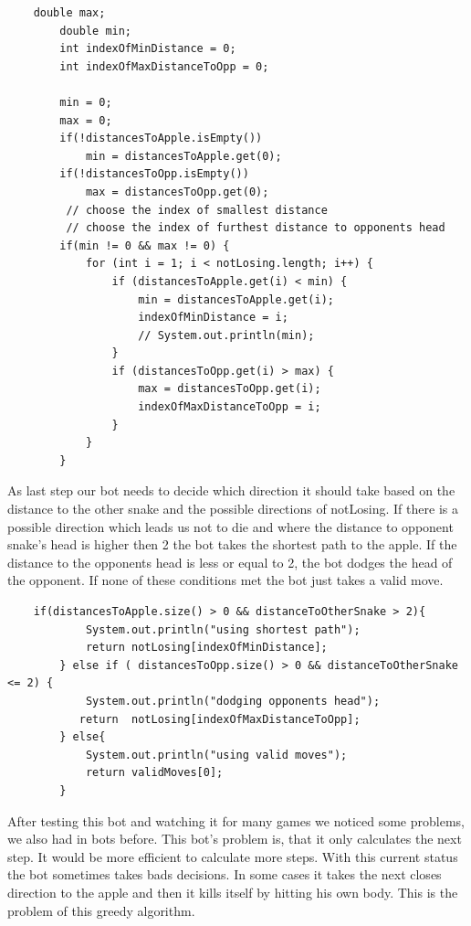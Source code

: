 \documentclass[a4paper,12pt]{article}
\begin{document}
\begin{verbatim}
	double max;
        double min;
        int indexOfMinDistance = 0;
        int indexOfMaxDistanceToOpp = 0;

        min = 0;
        max = 0;
        if(!distancesToApple.isEmpty())
            min = distancesToApple.get(0);
        if(!distancesToOpp.isEmpty())
            max = distancesToOpp.get(0);
         // choose the index of smallest distance
         // choose the index of furthest distance to opponents head
        if(min != 0 && max != 0) {
            for (int i = 1; i < notLosing.length; i++) {
                if (distancesToApple.get(i) < min) {
                    min = distancesToApple.get(i);
                    indexOfMinDistance = i;
                    // System.out.println(min);
                }
                if (distancesToOpp.get(i) > max) {
                    max = distancesToOpp.get(i);
                    indexOfMaxDistanceToOpp = i;
                }
            }
        }
\end{verbatim}
As last step our bot needs to decide which direction it should take based on the distance to the other snake and the possible directions of notLosing. If there is a possible direction which leads us not to die and where the distance to opponent snake's head is higher then 2 the bot takes the shortest path to the apple. If the distance to the opponents head is less or equal to 2, the bot dodges the head of the opponent. If none of these conditions met the bot just takes a valid move.
\begin{verbatim}
	if(distancesToApple.size() > 0 && distanceToOtherSnake > 2){
            System.out.println("using shortest path");
            return notLosing[indexOfMinDistance];
        } else if ( distancesToOpp.size() > 0 && distanceToOtherSnake <= 2) {
            System.out.println("dodging opponents head");
           return  notLosing[indexOfMaxDistanceToOpp];
        } else{
            System.out.println("using valid moves");
            return validMoves[0];
        }
\end{verbatim}
After testing this bot and watching it for many games we noticed some problems, we also had in bots before. This bot's problem is, that it only calculates the next step. It would be more efficient to calculate more steps. With this current status the bot sometimes takes bads decisions. In some cases it takes the next closes direction to the apple and then it kills itself by hitting his own body. This is the problem of this greedy algorithm. 
\end{document}
